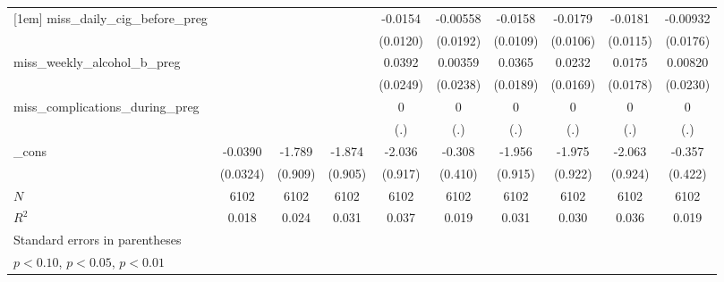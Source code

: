 \begin{table}[htbp]
\begin{tabular}{l*{9}{c}}
[1em]
miss\_daily\_cig\_before\_preg&                     &                     &                     &     -0.0154         &    -0.00558         &     -0.0158         &     -0.0179\sym{*}  &     -0.0181         &    -0.00932         \\
            &                     &                     &                     &    (0.0120)         &    (0.0192)         &    (0.0109)         &    (0.0106)         &    (0.0115)         &    (0.0176)         \\
[1em]
miss\_weekly\_alcohol\_b\_preg&                     &                     &                     &      0.0392         &     0.00359         &      0.0365\sym{*}  &      0.0232         &      0.0175         &     0.00820         \\
            &                     &                     &                     &    (0.0249)         &    (0.0238)         &    (0.0189)         &    (0.0169)         &    (0.0178)         &    (0.0230)         \\
[1em]
miss\_complications\_during\_preg&                     &                     &                     &           0         &           0         &           0         &           0         &           0         &           0         \\
            &                     &                     &                     &         (.)         &         (.)         &         (.)         &         (.)         &         (.)         &         (.)         \\
[1em]
\_cons      &     -0.0390         &      -1.789\sym{**} &      -1.874\sym{**} &      -2.036\sym{**} &      -0.308         &      -1.956\sym{**} &      -1.975\sym{**} &      -2.063\sym{**} &      -0.357         \\
            &    (0.0324)         &     (0.909)         &     (0.905)         &     (0.917)         &     (0.410)         &     (0.915)         &     (0.922)         &     (0.924)         &     (0.422)         \\
\hline
\(N\)       &        6102         &        6102         &        6102         &        6102         &        6102         &        6102         &        6102         &        6102         &        6102         \\
\(R^{2}\)   &       0.018         &       0.024         &       0.031         &       0.037         &       0.019         &       0.031         &       0.030         &       0.036         &       0.019         \\
\hline\hline
\multicolumn{10}{l}{\footnotesize Standard errors in parentheses}\\
\multicolumn{10}{l}{\footnotesize \sym{*} \(p<0.10\), \sym{**} \(p<0.05\), \sym{***} \(p<0.01\)}\\
\end{tabular}
\end{table}
